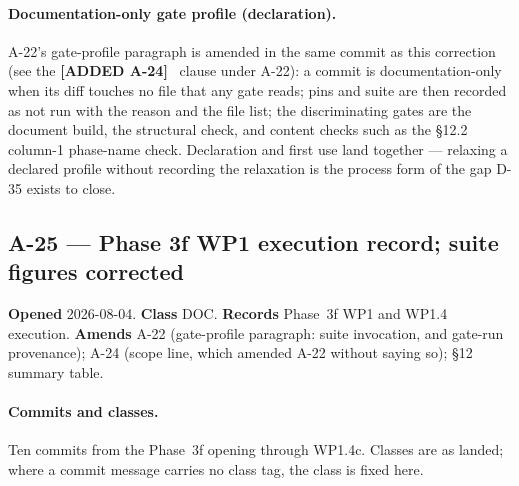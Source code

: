 \documentclass[
  10pt,
]{article}
\newcommand{\amdnew}[1]{{\color{amdcolor}\footnotesize\textbf{[ADDED #1]}}\ }
\begin{document}
\paragraph{Documentation-only gate profile (declaration).}
A-22's gate-profile paragraph is amended in the same commit as this correction (see the \amdnew{A-24} clause under A-22): a commit is documentation-only when its diff touches no file that any gate reads; pins and suite are then recorded as not run with the reason and the file list; the discriminating gates are the document build, the structural check, and content checks such as the §12.2 column-1 phase-name check. Declaration and first use land together --- relaxing a declared profile without recording the relaxation is the process form of the gap D-35 exists to close.


\hypertarget{a-25}{%
\subsection{A-25 --- Phase 3f WP1 execution record; suite figures corrected}\label{a-25}}

\textbf{Opened} 2026-08-04. \textbf{Class} DOC. \textbf{Records} Phase~3f WP1 and WP1.4 execution. \textbf{Amends} A-22 (gate-profile paragraph: suite invocation, and gate-run provenance); A-24 (scope line, which amended A-22 without saying so); §12 summary table.

\paragraph{Commits and classes.}
Ten commits from the Phase~3f opening through WP1.4c. Classes are as landed; where a commit message carries no class tag, the class is fixed here.
\end{document}
